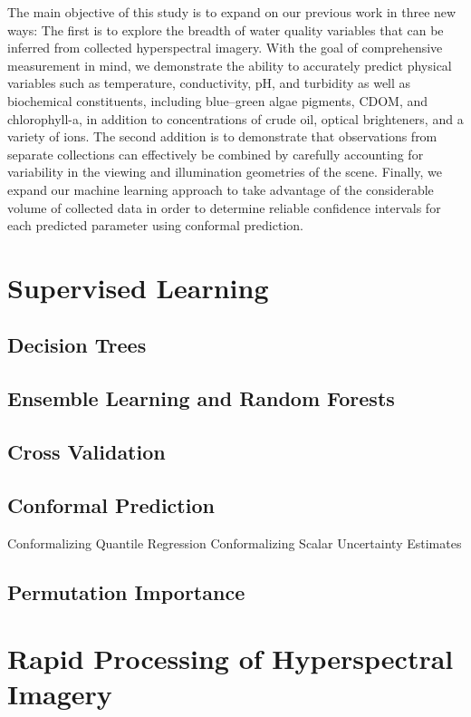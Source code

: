 The main objective of this study is to expand on our previous work in three new ways: The first is to explore the breadth of water quality variables that can be inferred from collected hyperspectral imagery. With the goal of comprehensive measurement in mind, we demonstrate the ability to accurately predict physical variables such as temperature, conductivity, pH, and turbidity as well as biochemical constituents, including blue--green algae pigments, CDOM, and chlorophyll-a, in addition to concentrations of crude oil, optical brighteners, and a variety of ions. The second addition is to demonstrate that observations from separate collections can effectively be combined by carefully accounting for variability in the viewing and illumination geometries of the scene. Finally, we expand our machine learning approach to take advantage of the considerable volume of collected data in order to determine reliable confidence intervals for each predicted parameter using conformal prediction.




\section{Supervised Learning}
\subsection{Decision Trees}
\subsection{Ensemble Learning and Random Forests}
\subsection{Cross Validation}
\subsection{Conformal Prediction}
Conformalizing Quantile Regression
Conformalizing Scalar Uncertainty Estimates
\subsection{Permutation Importance}



\section{Rapid Processing of Hyperspectral Imagery}
